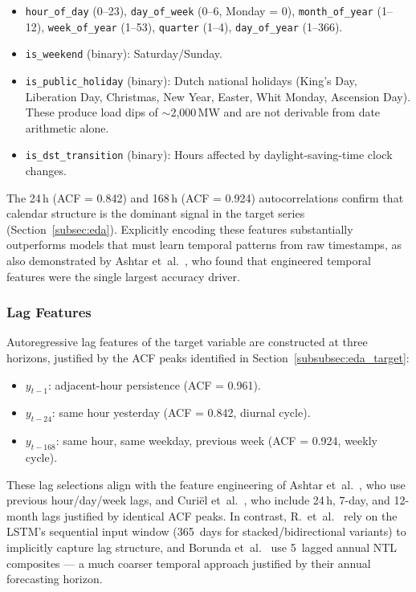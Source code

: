 \begin{itemize}
    \item \texttt{hour\_of\_day} (0--23), \texttt{day\_of\_week} (0--6, Monday = 0), \texttt{month\_of\_year} (1--12), \texttt{week\_of\_year} (1--53), \texttt{quarter} (1--4), \texttt{day\_of\_year} (1--366).
    \item \texttt{is\_weekend} (binary): Saturday/Sunday.
    \item \texttt{is\_public\_holiday} (binary): Dutch national holidays (King's Day, Liberation Day, Christmas, New Year, Easter, Whit Monday, Ascension Day). These produce load dips of $\sim$2{,}000\,MW and are not derivable from date arithmetic alone.
    \item \texttt{is\_dst\_transition} (binary): Hours affected by daylight-saving-time clock changes.
\end{itemize}

The 24\,h (ACF = 0.842) and 168\,h (ACF = 0.924) autocorrelations confirm that calendar structure is the dominant signal in the target series (Section~\ref{subsec:eda}). Explicitly encoding these features substantially outperforms models that must learn temporal patterns from raw timestamps, as also demonstrated by Ashtar et~al.~\cite{ashtar_hybrid_2025}, who found that engineered temporal features were the single largest accuracy driver.

\subsubsection{Lag Features}
\label{subsubsec:lag_features}

Autoregressive lag features of the target variable are constructed at three horizons, justified by the ACF peaks identified in Section~\ref{subsubsec:eda_target}:

\begin{itemize}
    \item $y_{t-1}$: adjacent-hour persistence (ACF = 0.961).
    \item $y_{t-24}$: same hour yesterday (ACF = 0.842, diurnal cycle).
    \item $y_{t-168}$: same hour, same weekday, previous week (ACF = 0.924, weekly cycle).
\end{itemize}

These lag selections align with the feature engineering of Ashtar et~al.~\cite{ashtar_hybrid_2025}, who use previous hour/day/week lags, and Curi\"el et~al.~\cite{curiel_integrating_2025}, who include 24\,h, 7-day, and 12-month lags justified by identical ACF peaks. In contrast, R.~et~al.~\cite{r_forecasting_2025} rely on the LSTM's sequential input window (365~days for stacked/bidirectional variants) to implicitly capture lag structure, and Borunda et~al.~\cite{borunda_machine_2025} use 5~lagged annual NTL composites — a much coarser temporal approach justified by their annual forecasting horizon.

